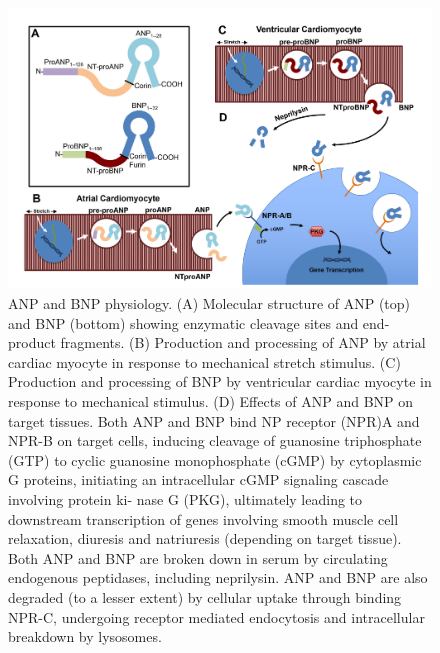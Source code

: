 \documentclass[14pt,a4paper,onecolumn]{extarticle}
\begin{document}

\begin{figure}      \centering      \includegraphics[scale=0.4]{../../images/NP_physiology.png}      \caption{ANP and BNP physiology. (A) Molecular structure of ANP (top) and BNP (bottom) showing enzymatic cleavage sites and end-product fragments. (B) Production and processing of ANP by atrial cardiac myocyte in response to mechanical stretch stimulus. (C) Production and processing of BNP by ventricular cardiac myocyte in response to mechanical stimulus. (D) Effects of ANP and BNP on target tissues. Both ANP and BNP bind NP receptor (NPR)A and NPR-B on target cells, inducing cleavage of guanosine triphosphate (GTP) to cyclic guanosine monophosphate (cGMP) by cytoplasmic G proteins, initiating an intracellular cGMP signaling cascade involving protein ki- nase G (PKG), ultimately leading to downstream transcription of genes involving smooth muscle cell relaxation, diuresis and natriuresis (depending on target tissue). Both ANP and BNP are broken down in serum by circulating endogenous peptidases, including neprilysin. ANP and BNP are also degraded (to a lesser extent) by cellular uptake through binding NPR-C, undergoing receptor mediated endocytosis and intracellular breakdown by lysosomes. \citep{Maisel2018}}       \label{NP_physiology}  \end{figure}
\end{document}
